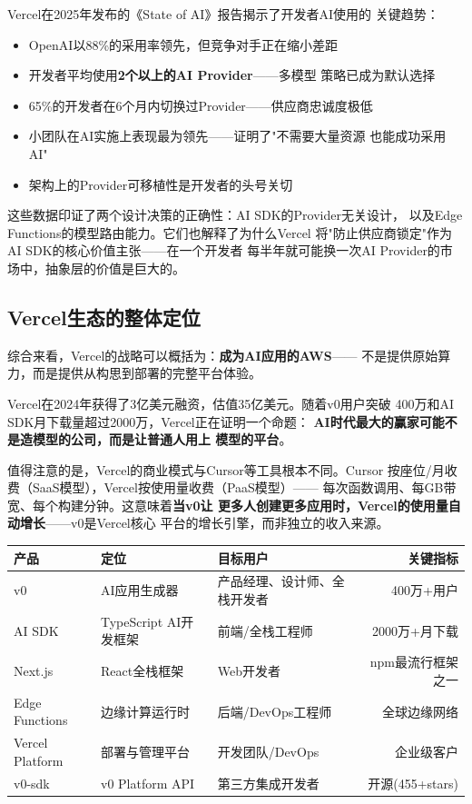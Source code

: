 Vercel在2025年发布的《State of AI》报告揭示了开发者AI使用的
关键趋势：
\begin{itemize}
  \item OpenAI以88\%的采用率领先，但竞争对手正在缩小差距
  \item 开发者平均使用\textbf{2个以上的AI Provider}——多模型
    策略已成为默认选择
  \item 65\%的开发者在6个月内切换过Provider——供应商忠诚度极低
  \item 小团队在AI实施上表现最为领先——证明了"不需要大量资源
    也能成功采用AI"
  \item 架构上的Provider可移植性是开发者的头号关切
\end{itemize}
这些数据印证了两个设计决策的正确性：AI SDK的Provider无关设计，
以及Edge Functions的模型路由能力。它们也解释了为什么Vercel
将"防止供应商锁定"作为AI SDK的核心价值主张——在一个开发者
每半年就可能换一次AI Provider的市场中，抽象层的价值是巨大的。

\subsection{Vercel生态的整体定位}
\label{subsec:vercel-position}

综合来看，Vercel的战略可以概括为：\textbf{成为AI应用的AWS}——
不是提供原始算力，而是提供从构思到部署的完整平台体验。

Vercel在2024年获得了3亿美元融资，估值35亿美元。随着v0用户突破
400万和AI SDK月下载量超过2000万，Vercel正在证明一个命题：
\textbf{AI时代最大的赢家可能不是造模型的公司，而是让普通人用上
模型的平台}。

值得注意的是，Vercel的商业模式与Cursor等工具根本不同。Cursor
按座位/月收费（SaaS模型），Vercel按使用量收费（PaaS模型）——
每次函数调用、每GB带宽、每个构建分钟。这意味着\textbf{当v0让
更多人创建更多应用时，Vercel的使用量自动增长}——v0是Vercel核心
平台的增长引擎，而非独立的收入来源。

\begin{keybox}[Vercel生态核心产品矩阵]
\small
\begin{tabularx}{\textwidth}{l X X r}
\toprule
\rowcolor{figLightGray}
\textbf{产品} & \textbf{定位} & \textbf{目标用户}
  & \textbf{关键指标} \\
\midrule
v0             & AI应用生成器       & 产品经理、设计师、全栈开发者
  & 400万+用户 \\
AI SDK         & TypeScript AI开发框架 & 前端/全栈工程师
  & 2000万+月下载 \\
Next.js        & React全栈框架       & Web开发者
  & npm最流行框架之一 \\
Edge Functions & 边缘计算运行时      & 后端/DevOps工程师
  & 全球边缘网络 \\
Vercel Platform & 部署与管理平台      & 开发团队/DevOps
  & 企业级客户 \\
v0-sdk         & v0 Platform API     & 第三方集成开发者
  & 开源(455+stars) \\
\bottomrule
\end{tabularx}
\end{keybox}

